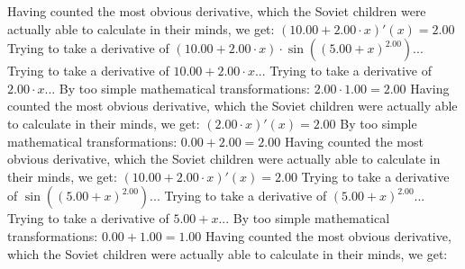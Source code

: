 \documentclass{article}
\begin{document}
 \newline
 \newline 
Having counted the most obvious derivative, which the Soviet children were actually able to calculate in their minds, we get:
$({{10.00} + {{2.00} \cdot {x}}})'(x) = {2.00}$\newline
\newline
Trying to take a derivative of ${\left({{10.00} + {{2.00} \cdot {x}}}\right) \cdot  \sin {\left({\left({{5.00} + {x}}\right) ^ {2.00}}\right)} }$...\newline
\newline
Trying to take a derivative of ${{10.00} + {{2.00} \cdot {x}}}$...\newline
\newline
Trying to take a derivative of ${{2.00} \cdot {x}}$...\newline
\newline
By too simple mathematical transformations:
 ${{2.00} \cdot {1.00}} = {2.00}$ 
 \newline
 \newline 
Having counted the most obvious derivative, which the Soviet children were actually able to calculate in their minds, we get:
$({{2.00} \cdot {x}})'(x) = {2.00}$\newline
\newline
By too simple mathematical transformations:
 ${{0.00} + {2.00}} = {2.00}$ 
 \newline
 \newline 
Having counted the most obvious derivative, which the Soviet children were actually able to calculate in their minds, we get:
$({{10.00} + {{2.00} \cdot {x}}})'(x) = {2.00}$\newline
\newline
Trying to take a derivative of $ \sin {\left({\left({{5.00} + {x}}\right) ^ {2.00}}\right)} $...\newline
\newline
Trying to take a derivative of ${\left({{5.00} + {x}}\right) ^ {2.00}}$...\newline
\newline
Trying to take a derivative of ${{5.00} + {x}}$...\newline
\newline
By too simple mathematical transformations:
 ${{0.00} + {1.00}} = {1.00}$ 
 \newline
 \newline 
Having counted the most obvious derivative, which the Soviet children were actually able to calculate in their minds, we get:
\end{document}
